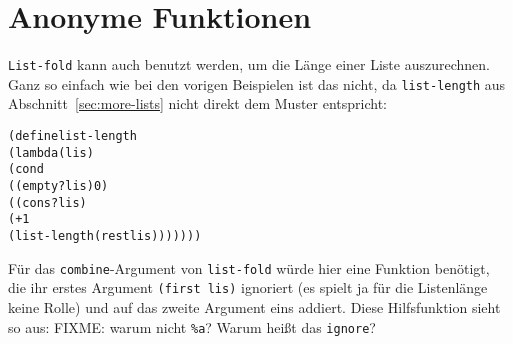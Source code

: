 \section{Anonyme Funktionen}\label{sec:anonymous-procedures}

\texttt{List-fold} kann auch benutzt werden, um die Länge einer Liste
auszurechnen.  Ganz so einfach wie bei den vorigen Beispielen ist das
nicht, da \texttt{list-length} aus
Abschnitt~\ref{sec:more-lists} nicht direkt dem Muster entspricht:
%
\begin{alltt}
(define list-length
  (lambda (lis)
    (cond
      ((empty? lis) 0)
      ((cons? lis) 
       (+ 1 
          (list-length (rest lis)))))))
\end{alltt}
%
Für das \texttt{combine}-Argument von \texttt{list-fold}
würde hier eine Funktion benötigt, die ihr erstes
Argument \texttt{(first lis)} ignoriert (es spielt ja für die Listenlänge
keine Rolle) und auf das zweite Argument eins addiert.  Diese
Hilfsfunktion sieht so aus:
%
FIXME: warum nicht \texttt{\%a}?  Warum heißt das \texttt{ignore}?

